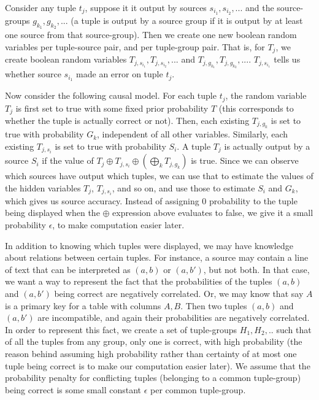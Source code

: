 \documentclass{sig-alternate}
\newcounter{prob}
\begin{document}
Consider any tuple $t_j$, suppose it it output by sources $s_{i_1}, s_{i_2}, ... $ and the source-groups $g_{k_1}, g_{k_2}, ...$ (a tuple is output by a source group if it is output by at least one source from that source-group). Then we create one new boolean random variables per tuple-source pair, and per tuple-group pair. That is, for $T_j$, we create boolean random variables $T_{j, s_{i_1}}, T_{j, s_{i_2}}, ...$ and $T_{j,g_{k_1}}, T_{j, g_{k_2}}, ...$. $T_{j, s_{i_1}}$ tells us whether source $s_{i_1}$ made an error on tuple $t_j$. 

Now consider the following causal model. For each tuple $t_j$, the random variable $T_j$ is first set to true with some fixed prior probability $T$ (this corresponds to whether the tuple is actually correct or not). Then, each existing $T_{j, g_k}$ is set to true with probability $G_k$, independent of all other variables. Similarly, each existing $T_{j, s_i}$ is set to true with probability $S_i$. A tuple $T_j$ is actually output by a source $S_i$ if the value of $T_j \oplus T_{j, s_i} \oplus(\bigoplus_{k} T_{j, g_k})$ is true. Since we can observe which sources have output which tuples, we can use that to estimate the values of the hidden variables $T_j$, $T_{j, s_i}$, and so on, and use those to estimate $S_i$ and $G_k$, which gives us source accuracy. Instead of assigning $0$ probability to the tuple being displayed when the $\oplus$ expression above evaluates to false, we give it a small probability $\epsilon$, to make computation easier later.

In addition to knowing which tuples were displayed, we may have knowledge about relations between certain tuples. For instance, a source may contain a line of text that can be interpreted as $(a,b)$ or $(a, b')$, but not both. In that case, we want a way to represent the fact that the probabilities of the tuples $(a, b)$ and $(a, b')$ being correct are negatively correlated. Or, we may know that say $A$ is a primary key for a table with columns $A,B$. Then two tuples $(a,b)$ and $(a,b')$ are incompatible, and again their probabilities are negatively correlated. In order to represent this fact, we create a set of tuple-groups $H_1, H_2, ..$ such that of all the tuples from any group, only one is correct, with high probability (the reason behind assuming high probability rather than certainty of at most one tuple being correct is to make our computation easier later). We assume that the probability penalty for conflicting tuples (belonging to a common tuple-group) being correct is some small constant $\epsilon$ per common tuple-group. 
\end{document}
